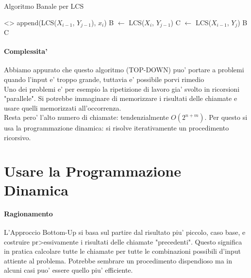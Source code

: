 \begin{algorithm}
    \renewcommand\thealgorithm{}
    \caption{Algoritmo Banale per LCS}
    \begin{algorithmic}
                \State \Return <>
            \Else
                    \State \Return append(LCS($X_{i-1}$, $Y_{j-1}$), $x_{i}$)
                \Else
                    \State B $\gets$ LCS($X_{i}$, $Y_{j-1}$)
                    \State C $\gets$ LCS($X_{i-1}$, $Y_{j}$)
                        \State \Return B
                    \Else
                        \State \Return C
                    \EndIf
                \EndIf
            \EndIf
        \EndProcedure
    \end{algorithmic}
\end{algorithm}

\paragraph{Complessita'}

Abbiamo appurato che questo algoritmo (TOP-DOWN) puo' portare a problemi quando l'input e' troppo grande, tuttavia e' possibile porvi rimedio \\

Uno dei problemi e' per esempio la ripetizione di lavoro gia' svolto in ricorsioni "parallele".
Si potrebbe immaginare di memorizzare i risultati delle chiamate e usare quelli memorizzati all'occorrenza. \\
Resta pero' l'alto numero di chiamate: tendenzialmente $O(2^{n + m})$.
Per questo si usa la programmazione dinamica: si risolve iterativamente un procedimento ricorsivo.

\section{Usare la Programmazione Dinamica}

\paragraph{Ragionamento}

L'Approccio Bottom-Up si basa sul partire dal risultato piu' piccolo, caso base, e costruire pr>essivamente i risultati delle chiamate "precedenti".
Questo significa in pratica calcolare tutte le chiamate per tutte le combinazioni possibili d'input attiente al problema.
Potrebbe sembrare un procedimento dispendioso ma in alcuni casi puo' essere quello piu' efficiente. \\

